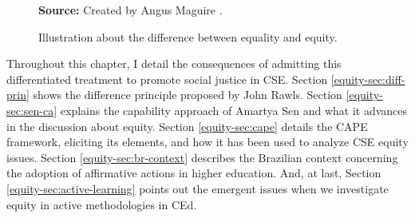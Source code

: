 \begin{figure}[ht!]
\centering

\caption{\textmd{Illustration about the difference between equality and equity.}}
\label{fig:equality-vs-equity}

\par\medskip\ABNTEXfontereduzida\selectfont\textbf{Source:} Created by Angus Maguire \cite{maguire:2016}.%
\end{figure}

Throughout this chapter, I detail the consequences of admitting this differentiated treatment to promote social justice in \gls{CSE}. Section \ref{equity-sec:diff-prin} shows the difference principle proposed by John Rawls. Section \ref{equity-sec:sen-ca} explains the capability approach of Amartya Sen and what it advances in the discussion about equity. Section \ref{equity-sec:cape} details the \gls{CAPE} framework, eliciting its elements, and how it has been used to analyze \gls{CSE} equity issues. Section \ref{equity-sec:br-context} describes the Brazilian context concerning the adoption of affirmative actions in higher education. And, at last, Section \ref{equity-sec:active-learning} points out the emergent issues when we investigate equity in active methodologies in \gls{CEd}.
